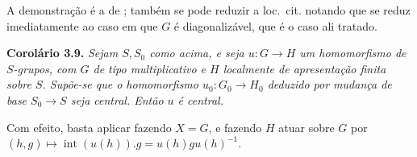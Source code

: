 A demonstração é a de
; também se pode
reduzir a loc.\ cit. notando que
 se reduz imediatamente ao caso
em que \(G\) é diagonalizável, que é o caso ali tratado.

\medskip
\noindent{}\textbf{Corolário 3.9.}
\textit{Sejam \(S,S_0\) como acima, e seja \(u:G\to H\) um homomorfismo de
\(S\)-grupos, com \(G\) de tipo multiplicativo e \(H\) localmente de
apresentação finita sobre \(S\). Supõe-se que o homomorfismo
\(u_0:G_0\to H_0\) deduzido por mudança de base \(S_0\to S\) seja
central. Então \(u\) é central.}

Com efeito, basta aplicar 
fazendo \(X=G\), e fazendo \(H\) atuar sobre \(G\) por
\((h,g)\mapsto\operatorname{int}(u(h)).g=u(h)gu(h)^{-1}\).

